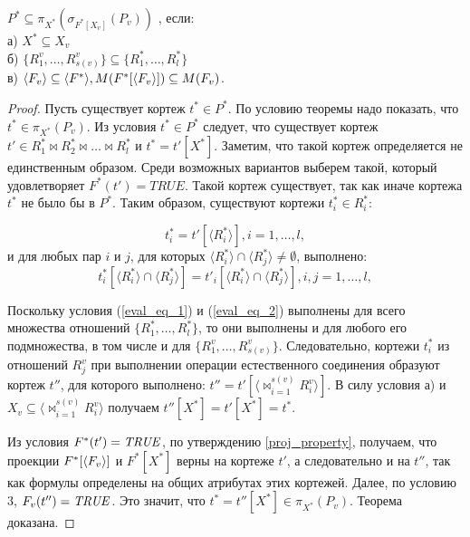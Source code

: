 \author{Мосин Сергей, Зыкин Сергей}
\begin{theorem}
$P^{\ast} \subseteq \pi_{X^{\ast}} (\sigma_{F^{\ast}[X_v]} (P_{v}))$
, если:
\\а) $X^{\ast} \subseteq X_{v}$
\\б) 
$ \{R^{v}_{1}, \ldots, R^{v}_{s(v)}\}
\subseteq
\{R^{\ast}_{1}, \ldots, R^{\ast}_{l}\} $
\\в) $\<F_v> \subseteq \<F^{\ast}> , M (F^{\ast}[\<F_v> ]) \subseteq
M (F_{v}) $.
\label{th_base}
\end{theorem} 
\begin{proof}
Пусть существует кортеж $t^{\ast} \in P^{\ast}$. По условию теоремы надо показать, 
что $t^{\ast} \in \pi_{X^{\ast}} (P_{v})$. Из условия $t^{\ast} \in P^{\ast}$ следует, 
что существует кортеж $t' \in R^{\ast}_1 \bowtie R^{\ast}_2\bowtie\ldots
\bowtie R^{\ast}_l$ и $t^{\ast} = t'[X^{\ast}]$. Заметим, что такой кортеж 
определяется не единственным образом. Среди возможных вариантов выберем такой, 
который удовлетворяет $F^{\ast}(t')=TRUE$. Такой кортеж существует, так как иначе
кортежа $t^{\ast}$ не было бы в $P^{\ast}$. Таким образом, существуют кортежи
$t^{\ast}_i \in R^{\ast}_i$:

\begin{equation}
t^{\ast}_i = t'[\langle R^{\ast}_i\rangle], i = 1,\dots,l,
\label{eval_eq_1}
\end{equation}
\def \intersecij {\langle R^{\ast}_i \rangle \cap \langle R^{\ast}_j \rangle}
и для любых пар $i$ и $j$, для которых $\intersecij \neq \emptyset$, выполнено:
\begin{equation}
t^{\ast}_i[\intersecij] = t'_i[\intersecij], i,j = 1,\dots,l,
\label{eval_eq_2}
\end{equation}

Поскольку условия (\ref{eval_eq_1}) и (\ref{eval_eq_2}) выполнены для всего множества
отношений $\{R^{\ast}_{1}, \ldots, R^{\ast}_{l}\}$, то они выполнены и для любого его
подмножества, в том числе и для $\{R^{v}_{1}, \ldots, R^{v}_{s(v)}\}$.
Следовательно, кортежи $t^{\ast}_i$ из отношений $R^{v}_j$ при выполнении операции
естественного соединения образуют кортеж $t''$, для которого выполнено:
$t'' = t'[\langle {\bowtie}_{i=1}^{s(v)} R^v_i \rangle]$. В силу условия а) и 
$X_v \subseteq \langle {\bowtie}_{i=1}^{s(v)} R^v_i \rangle$ получаем 
$t''[X^{\ast}] = t'[X^{\ast}] = t^{\ast}$.

Из условия  $F^{\ast}(t') = \mathit{TRUE}$, по утверждению
\ref{proj_property}, получаем, что проекции $F^{\ast}[\<F_v> ]$ и $F^{\ast} [X^{\ast}]$ верны на кортеже $t'$, а следовательно и на $t''$, так как формулы определены на общих атрибутах этих кортежей. Далее, по условию 3, $F_v (t'') = \mathit{TRUE}$.
Это значит, что $t^{\ast} = t''[X^{\ast}] \in \pi_{X^{\ast}} (P_{v})$. Теорема
доказана.
\end{proof}
